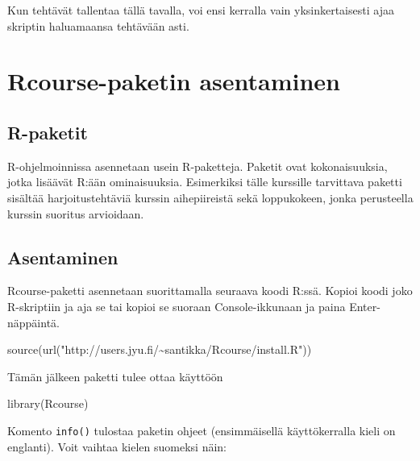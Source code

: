 \documentclass[
]{book}
\newenvironment{Shaded}{\begin{snugshade}}{\end{snugshade}}
\newcommand{\FunctionTok}[1]{\textcolor[rgb]{0.00,0.00,0.00}{#1}}
\newcommand{\NormalTok}[1]{#1}
\newcommand{\StringTok}[1]{\textcolor[rgb]{0.31,0.60,0.02}{#1}}
\begin{document}
Kun tehtävät tallentaa tällä tavalla, voi ensi kerralla vain yksinkertaisesti ajaa skriptin haluamaansa tehtävään asti.

\hypertarget{rcourse-paketin-asentaminen}{%
\section*{Rcourse-paketin asentaminen}\label{rcourse-paketin-asentaminen}}

\hypertarget{r-paketit}{%
\subsection*{R-paketit}\label{r-paketit}}

R-ohjelmoinnissa asennetaan usein R-paketteja. Paketit ovat kokonaisuuksia, jotka lisäävät R:ään ominaisuuksia. Esimerkiksi tälle kurssille tarvittava paketti sisältää harjoitustehtäviä kurssin aihepiireistä sekä loppukokeen, jonka perusteella kurssin suoritus arvioidaan.

\hypertarget{asentaminen}{%
\subsection*{Asentaminen}\label{asentaminen}}

Rcourse-paketti asennetaan suorittamalla seuraava koodi R:ssä. Kopioi koodi joko R-skriptiin ja aja se tai kopioi se suoraan Console-ikkunaan ja paina Enter-näppäintä.

\begin{Shaded}
\begin{Highlighting}[]
\FunctionTok{source}\NormalTok{(}\FunctionTok{url}\NormalTok{(}\StringTok{"http://users.jyu.fi/\textasciitilde{}santikka/Rcourse/install.R"}\NormalTok{))}
\end{Highlighting}
\end{Shaded}

Tämän jälkeen paketti tulee ottaa käyttöön

\begin{Shaded}
\begin{Highlighting}[]
\FunctionTok{library}\NormalTok{(Rcourse)}
\end{Highlighting}
\end{Shaded}

Komento \texttt{info()} tulostaa paketin ohjeet (ensimmäisellä käyttökerralla kieli on englanti). Voit vaihtaa kielen suomeksi näin:
\end{document}
